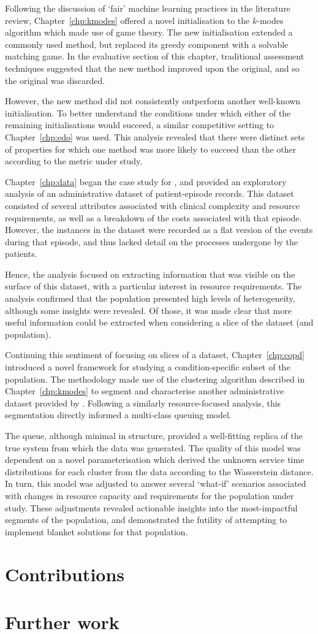 Following the discussion of `fair' machine learning practices in the literature
review, Chapter~\ref{chp:kmodes} offered a novel initialisation to the
\(k\)-modes algorithm which made use of game theory. The new initialisation
extended a commonly used method, but replaced its greedy component with a
solvable matching game. In the evaluative section of this chapter, traditional
assessment techniques suggested that the new method improved upon the original,
and so the original was discarded.

However, the new method did not consistently outperform another well-known
initialisation. To better understand the conditions under which either of the
remaining initialisations would succeed, a similar competitive setting to
Chapter~\ref{chp:edo} was used. This analysis revealed that there were distinct
sets of properties for which one method was more likely to succeed than the
other according to the metric under study.

Chapter~\ref{chp:data} began the case study for \ctmuhb, and provided an
exploratory analysis of an administrative dataset of patient-episode records.
This dataset consisted of several attributes associated with clinical complexity
and resource requirements, as well as a breakdown of the costs associated with
that episode. However, the instances in the dataset were recorded as a flat
version of the events during that episode, and thus lacked detail on the
processes undergone by the patients.

Hence, the analysis focused on extracting information that was visible on the
surface of this dataset, with a particular interest in resource requirements.
The analysis confirmed that the population presented high levels of
heterogeneity, although some insights were revealed. Of those, it was made clear
that more useful information could be extracted when considering a slice of the
dataset (and population).

Continuing this sentiment of focusing on slices of a dataset,
Chapter~\ref{chp:copd} introduced a novel framework for studying a
condition-specific subset of the population. The methodology made use of the
clustering algorithm described in Chapter~\ref{chp:kmodes} to segment and
characterise another administrative dataset provided by \ctmuhb. Following a
similarly resource-focused analysis, this segmentation directly informed a
multi-class queuing model.

The queue, although minimal in structure, provided a well-fitting replica of the
true system from which the data was generated. The quality of this model was
dependent on a novel parameterisation which derived the unknown service time
distributions for each cluster from the data according to the Wasserstein
distance. In turn, this model was adjusted to answer several `what-if' scenarios
associated with changes in resource capacity and requirements for the population
under study. These adjustments revealed actionable insights into the
most-impactful segments of the population, and demonstrated the futility of
attempting to implement blanket solutions for that population.

\section{Contributions}



\section{Further work}
